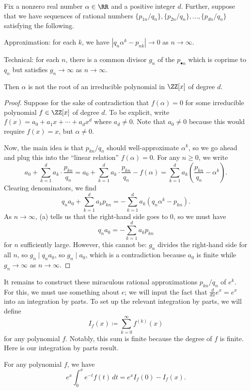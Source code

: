 \documentclass[../notes.tex]{subfiles}
\begin{document}
\begin{lemma} \label{lem:get-trans-simul}
	Fix a nonzero real number $\alpha\in\RR$ and a positive integer $d$. Further, suppose that we have sequences of rational numbers $\{p_{1n}/q_n\},\{p_{2n}/q_n\},\ldots,\{p_{dn}/q_n\}$ satisfying the following.
	\begin{listalph}
		\item Approximation: for each $k$, we have $\left|q_n\alpha^k-p_{nk}\right|\to0$ as $n\to\infty$.
		\item Technical: for each $n$, there is a common divisor $g_n$ of the $p_{\bullet n}$ which is coprime to $q_n$ but satisfies $g_n\to\infty$ as $n\to\infty$.
	\end{listalph}
	Then $\alpha$ is not the root of an irreducible polynomial in $\ZZ[x]$ of degree $d$.
\end{lemma}
\begin{proof}
	Suppose for the sake of contradiction that $f(\alpha)=0$ for some irreducible polynomial $f\in\ZZ[x]$ of degree $d$. To be explicit, write $f(x)=a_0+a_1x+\cdots+a_dx^d$ where $a_d\ne0$. Note that $a_0\ne0$ because this would require $f(x)=x$, but $\alpha\ne0$.

	Now, the main idea is that $p_{kn}/q_n$ should well-approximate $\alpha^k$, so we go ahead and plug this into the ``linear relation'' $f(\alpha)=0$. For any $n\ge0$, we write
	\[a_0+\sum_{k=1}^da_k\cdot\frac{p_{kn}}{q_n}=a_0+\sum_{k=1}^da_k\cdot\frac{p_{kn}}{q_n}-f(\alpha)=\sum_{k=1}^da_k\left(\frac{p_{kn}}{q_n}-\alpha^k\right).\]
	Clearing denominators, we find
	\[q_na_0+\sum_{k=1}^da_kp_{kn}=-\sum_{k=1}^da_k\left(q_n\alpha^k-p_{kn}\right).\]
	As $n\to\infty$, (a) tells us that the right-hand side goes to $0$, so we must have
	\[q_na_0=-\sum_{k=1}^da_kp_{kn}\]
	for $n$ sufficiently large. However, this cannot be: $g_n$ divides the right-hand side for all $n$, so $g_n\mid q_na_0$, so $g_n\mid a_0$, which is a contradiction because $a_0$ is finite while $g_n\to\infty$ as $n\to\infty$.
\end{proof}
It remains to construct these miraculous rational approximations $p_{kn}/q_n$ of $e^k$. For this, we must use something about $e$; we will input the fact that $\frac d{dx}e^x=e^x$ into an integration by parts. To set up the relevant integration by parts, we will define
\[I_f(x)\coloneqq\sum_{k=0}^\infty f^{(k)}(x)\]
for any polynomial $f$. Notably, this sum is finite because the degree of $f$ is finite. Here is our integration by parts result.
\begin{lemma} \label{lem:hermite}
	For any polynomial $f$, we have
	\[e^x\int_0^xe^{-t}f(t)\,dt=e^xI_f(0)-I_f(x).\]
\end{lemma}
\end{document}

